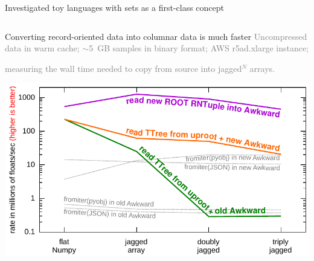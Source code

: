 \documentclass[aspectratio=169]{beamer}
\begin{document}
\begin{frame}[fragile]{Investigated toy languages with sets as a first-class concept}
\begin{columns}
\large
\vspace{-0.45 cm}

\vspace{0.2 cm}
\end{columns}
\end{frame}

\begin{frame}{Converting record-oriented data into columnar data is much faster}
\small
\vspace{0.3 cm}
\textcolor{gray}{Uncompressed data in warm cache; $\sim$5~GB samples in binary format; AWS r5ad.xlarge instance;}

\textcolor{gray}{measuring the wall time needed to copy from source into jagged$^N$ arrays.}

\vspace{-0.1 cm}
\begin{center}
\includegraphics[width=0.83\linewidth]{read_ttree.pdf}
\end{center}
\end{frame}
\end{document}
